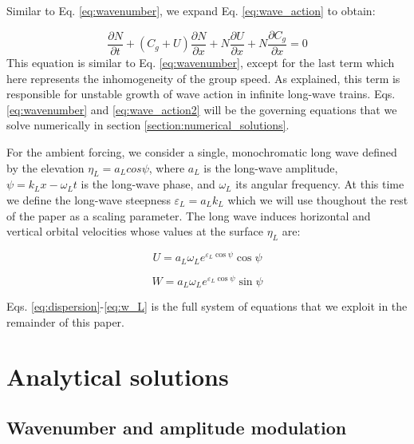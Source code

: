 \documentclass[draft]{agujournal2019}
\begin{document}
Similar to Eq. \ref{eq:wavenumber}, we expand Eq. \ref{eq:wave_action} to obtain:

\begin{equation}
\label{eq:wave_action2}
\dfrac{\partial N}{\partial t}
+ \left(C_g + U\right) \dfrac{\partial N}{\partial x}
+ N \dfrac{\partial U}{\partial x}
+ N \dfrac{\partial C_g}{\partial x}
= 0
\end{equation}
This equation is similar to Eq. \ref{eq:wavenumber}, except for the last term
which here represents the inhomogeneity of the group speed.
As  explained, this term is responsible for unstable
growth of wave action in infinite long-wave trains.
Eqs. \ref{eq:wavenumber} and \ref{eq:wave_action2} will be the governing equations
that we solve numerically in section \ref{section:numerical_solutions}.

For the ambient forcing, we consider a single, monochromatic long wave
defined by the elevation $\eta_L = a_L cos{\psi}$,
where $a_L$ is the long-wave amplitude, $\psi = k_L x - \omega_L t$ is the
long-wave phase, and $\omega_L$ its angular frequency.
At this time we define the long-wave steepness $\varepsilon_L = a_L k_L$ which
we will use thoughout the rest of the paper as a scaling parameter.
The long wave induces horizontal and vertical orbital velocities whose values
at the surface $\eta_L$ are:

\begin{equation}
\label{eq:U_L}
U = a_L \omega_L e^{\varepsilon_L \cos{\psi}} \cos{\psi}
\end{equation}

\begin{equation}
\label{eq:w_L}
W = a_L \omega_L e^{\varepsilon_L \cos{\psi}} \sin{\psi}
\end{equation}

Eqs. \ref{eq:dispersion}-\ref{eq:w_L} is the full system of equations that we
exploit in the remainder of this paper.

\section{Analytical solutions}
\label{section:analytical_solutions}

\subsection{Wavenumber and amplitude modulation}
\label{subsection:analytical_solutions}
\end{document}
